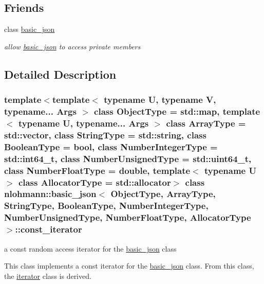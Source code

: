 \subsection*{Friends}
\begin{DoxyCompactItemize}
\item 
\hypertarget{classnlohmann_1_1basic__json_1_1const__iterator_ada3100cdb8700566051828f1355fa745}{}\label{classnlohmann_1_1basic__json_1_1const__iterator_ada3100cdb8700566051828f1355fa745} 
class \hyperlink{classnlohmann_1_1basic__json_1_1const__iterator_ada3100cdb8700566051828f1355fa745}{basic\+\_\+json}
\begin{DoxyCompactList}\small\item\em allow \hyperlink{classnlohmann_1_1basic__json}{basic\+\_\+json} to access private members \end{DoxyCompactList}\end{DoxyCompactItemize}


\subsection{Detailed Description}
\subsubsection*{template$<$template$<$ typename U, typename V, typename... Args $>$ class Object\+Type = std\+::map, template$<$ typename U, typename... Args $>$ class Array\+Type = std\+::vector, class String\+Type = std\+::string, class Boolean\+Type = bool, class Number\+Integer\+Type = std\+::int64\+\_\+t, class Number\+Unsigned\+Type = std\+::uint64\+\_\+t, class Number\+Float\+Type = double, template$<$ typename U $>$ class Allocator\+Type = std\+::allocator$>$\newline
class nlohmann\+::basic\+\_\+json$<$ Object\+Type, Array\+Type, String\+Type, Boolean\+Type, Number\+Integer\+Type, Number\+Unsigned\+Type, Number\+Float\+Type, Allocator\+Type $>$\+::const\+\_\+iterator}

a const random access iterator for the \hyperlink{classnlohmann_1_1basic__json}{basic\+\_\+json} class 

This class implements a const iterator for the \hyperlink{classnlohmann_1_1basic__json}{basic\+\_\+json} class. From this class, the \hyperlink{classnlohmann_1_1basic__json_1_1iterator}{iterator} class is derived.

